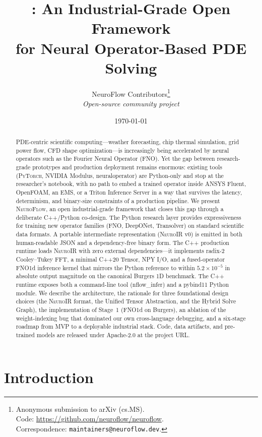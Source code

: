 \documentclass[10pt,twocolumn]{article}
\title{\nf: An Industrial-Grade Open Framework\\
       for Neural Operator-Based PDE Solving}
\author{
  NeuroFlow Contributors\thanks{Anonymous submission to arXiv (cs.MS).\\
    Code: \url{https://github.com/neuroflow/neuroflow}.\\
    Correspondence: \texttt{maintainers@neuroflow.dev}.}\\
  \textit{Open-source community project}
}
\date{\today}
\renewcommand{\texttt}[1]{{\normalfont\ttfamily #1}\normalfont\rmfamily}
\newcommand{\nf}{\textsc{NeuroFlow}}
\newcommand{\neuroir}{\textsc{NeuroIR}}
\newcommand{\py}{\textsc{PyTorch}}
\begin{document}
\maketitle

\begin{abstract}
PDE-centric scientific computing---weather forecasting, chip thermal
simulation, grid power flow, CFD shape optimization---is increasingly
being accelerated by neural operators such as the Fourier Neural
Operator (FNO).  Yet the gap between research-grade prototypes and
production deployment remains enormous: existing tools (\py{}, NVIDIA
Modulus, \texttt{neuraloperator}) are Python-only and stop at the
researcher's notebook, with no path to embed a trained operator inside
ANSYS Fluent, OpenFOAM, an EMS, or a Triton Inference Server in a way
that survives the latency, determinism, and binary-size constraints of
a production pipeline.
%
We present \nf, an open industrial-grade framework that closes this
gap through a deliberate C{++}/Python co-design.  The Python research
layer provides expressiveness for training new operator families
(FNO, DeepONet, Transolver) on standard scientific data formats.  A
portable intermediate representation (\neuroir{} v0) is emitted in
both human-readable JSON and a dependency-free binary form.  The C{++}
production runtime loads \neuroir{} with zero external
dependencies---it implements radix-2 Cooley--Tukey FFT, a minimal
C{++}20 Tensor, NPY I/O, and a fused-operator FNO1d inference kernel
that mirrors the Python reference to within $5.2 \times 10^{-5}$ in
absolute output magnitude on the canonical Burgers 1D benchmark.
The C{++} runtime exposes both a command-line tool
(\texttt{nflow\_infer}) and a pybind11 Python module.  We describe
the architecture, the rationale for three foundational design choices
(the \neuroir{} format, the Unified Tensor Abstraction, and the
Hybrid Solve Graph), the implementation of Stage~1 (FNO1d on
Burgers), an ablation of the weight-indexing bug that dominated our
own cross-language debugging, and a six-stage roadmap from MVP to a
deployable industrial stack.  Code, data artifacts, and pre-trained
models are released under Apache-2.0 at the project URL.
\end{abstract}

\section{Introduction}
\end{document}
